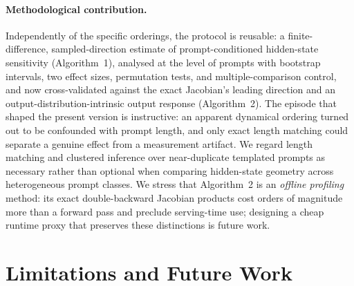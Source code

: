 \documentclass{article}
\begin{document}
\paragraph{Methodological contribution.}
Independently of the specific orderings, the protocol is reusable: a finite-difference,
sampled-direction estimate of prompt-conditioned hidden-state sensitivity (Algorithm~1), analysed
at the level of prompts with bootstrap intervals, two effect sizes, permutation tests, and
multiple-comparison control, and now cross-validated against the exact Jacobian's leading
direction and an output-distribution-intrinsic output response (Algorithm~2). The episode that
shaped the present version is instructive: an apparent dynamical ordering turned out to be
confounded with prompt length, and only exact length matching could separate a genuine effect from
a measurement artifact. We regard length matching and clustered inference over near-duplicate
templated prompts as necessary rather than optional when comparing hidden-state geometry across
heterogeneous prompt classes. We stress that Algorithm~2 is an \emph{offline profiling} method: its
exact double-backward Jacobian products cost orders of magnitude more than a forward pass and
preclude serving-time use; designing a cheap runtime proxy that preserves these distinctions is
future work.

\section{Limitations and Future Work}
\label{sec:limitations}
\end{document}
